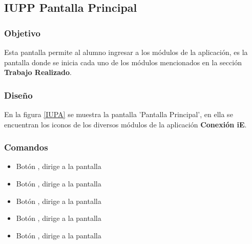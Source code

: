 \subsection{IUPP Pantalla Principal}

\subsubsection{Objetivo}

	
 	Esta pantalla permite al alumno ingresar a los módulos de la aplicación, es la pantalla donde se inicia cada uno de los módulos mencionados en la sección \textbf{Trabajo Realizado}.
\subsubsection{Diseño}


    En la figura \ref{IUPA} se muestra la pantalla 'Pantalla Principal', en ella se encuentran los iconos de los diversos módulos de la aplicación \textbf{Conexión iE}.



\subsubsection{Comandos}
\begin{itemize}
	
	\item Botón \botSalones, dirige a la pantalla 
	\item Botón \botProfesores, dirige a la pantalla 
	\item Botón \botUnidades, dirige a la pantalla 
	\item Botón \botMovilidad, dirige a la pantalla 
	\item Botón \botCursos, dirige a la pantalla 
\end{itemize}

